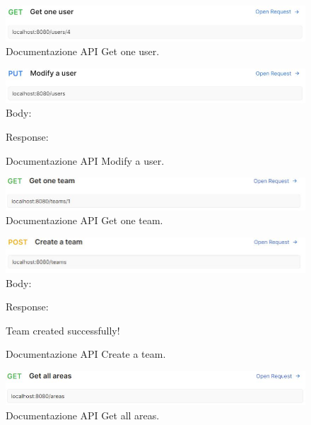 \begin{figure}[h!]
	\centering
	\includegraphics[width=1\linewidth]{./Iterazione 2/ImageFiles/GetOneUser}
	
	\caption{Documentazione API Get one user.}
	\label{fig:GetOneUserAPI}
\end{figure}

\begin{figure}[h!]
	\centering
	\includegraphics[width=1\linewidth]{./Iterazione 2/ImageFiles/ModifyAUser}
	Body:
	
	Response: 
	
	\caption{Documentazione API Modify a user.}
	\label{fig:ModifyAUserAPI}
\end{figure}

\begin{figure}[h!]
	\centering
	\includegraphics[width=1\linewidth]{./Iterazione 2/ImageFiles/GetOneTeam}
	
	\caption{Documentazione API Get one team.}
	\label{fig:GetOneTeamAPI}
\end{figure}

\begin{figure}[h!]
	\centering
	\includegraphics[width=1\linewidth]{./Iterazione 2/ImageFiles/CreateATeam}
	Body:
	
	Response: 
	
	Team created successfully!
	\caption{Documentazione API Create a team.}
	\label{fig:CreateATeamAPI}
\end{figure}


\begin{figure}[h!]
	\centering
	\includegraphics[width=1\linewidth]{./Iterazione 2/ImageFiles/GetAllAreas}
	
	\caption{Documentazione API Get all areas.}
	\label{fig:GetAllAreasAPI}
\end{figure}
